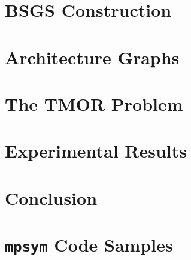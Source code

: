 
\chapter{BSGS Construction}
\label{chap:bsgs}


\chapter{Architecture Graphs}
\label{chap:ag}


\chapter{The TMOR Problem}
\label{chap:tmor}


\chapter{Experimental Results}
\label{chap:exp}


\chapter{Conclusion}
\label{chap:conc}


\newpage




\appendix
\chapter{\texttt{mpsym} Code Samples}



